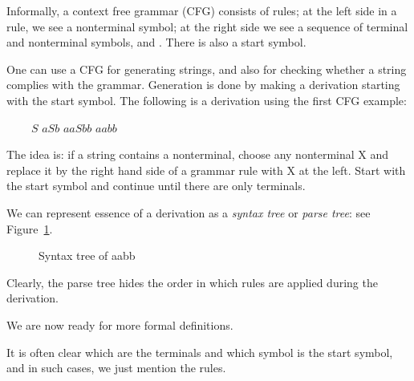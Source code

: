 Informally, a context free grammar (CFG) consists of rules; at the
left side in a rule, we see a nonterminal symbol; at the right side
we see a sequence of terminal and nonterminal symbols, and
\eps. There is also a start symbol.

One can use a CFG for generating strings, and also for checking
whether a string complies with the grammar. Generation is done by
making a derivation starting with the start symbol. The following is a
derivation using the first CFG example:

$~~~~~~~~~~S$ \rpijl $aSb$ \rpijl $aaSbb$ \rpijl $aabb$

The idea is: if a string contains a nonterminal, choose any
nonterminal X and replace it by the right hand side of a grammar rule
with X at the left. Start with the start symbol and continue until
there are only terminals.

We can represent essence of a derivation as a {\em syntax tree} or
{\em parse tree}: see Figure~\ref{parsetree1}.

\medskip
\begin{figure}[h]
\caption{Syntax tree of aabb \label{parsetree1}}
\end{figure}

Clearly, the parse tree hides the order in which rules are applied
during the derivation.

We are now ready for more formal definitions.

It is often clear which are the terminals and which symbol is the
start symbol, and in such cases, we just mention the rules.


